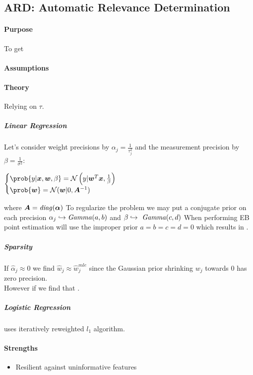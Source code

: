 \subsection{ARD: Automatic Relevance Determination}
\paragraph{Purpose}
To get  
\paragraph{Assumptions}
\paragraph{Theory} 
Relying on  $\tau$.
\subparagraph{Linear Regression}
Let's consider weight precisions by $\alpha_{j}=\frac{1}{\tau_{j}^{2}}$ and the 
measurement precision by $\beta=\frac{1}{\sigma^{2}}$:
\begin{center}
    $\begin{cases}
        \prob{y|\bm{x},\bm{w},\beta} = \mathcal{N}\left(y|\bm{w}^{T}\bm{x},\frac{1}{
            \beta}\right) \\
            \prob{\bm{w}} = \mathcal{N}(\bm{w}|0,\bm{A}^{-1})
    \end{cases}$
\end{center}
where $\bm{A}=\text{\emph{diag}}(\bm{\alpha})$
To regularize the problem we may put a conjugate prior on each precision $\alpha_{j}
\hookrightarrow \text{\emph{Gamma}}(a, b)$ and $\beta \hookrightarrow \text{\emph{
Gamma}}(c, d)$
When performing EB point estimation will use the improper prior $a=b=c=d=0$ which
results in .
\subparagraph{Sparsity}
If $\hat{\alpha}_{j} \approx 0$ we find $\hat{w}_{j}\approx \hat{w}^{mle}_{j}$ since
the Gaussian prior shrinking $w_{j}$ towards 0 has zero precision.\\
However if we find that .
\subparagraph{Logistic Regression}
uses iteratively reweighted $l_{1}$ algorithm.

\paragraph{Strengths}
\begin{itemize}
    \item Resilient against uninformative features
\end{itemize}

